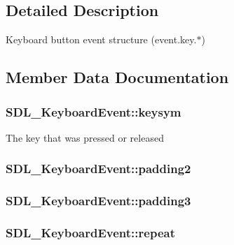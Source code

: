 \subsection{Detailed Description}
Keyboard button event structure (event.\-key.$\ast$) 

\subsection{Member Data Documentation}
\hypertarget{struct_s_d_l___keyboard_event_a2a57ba820a298f2c02ad5d41fd2b1aa8}{
\subsubsection[{keysym}]{ S\-D\-L\-\_\-\-Keyboard\-Event\-::keysym}}\label{struct_s_d_l___keyboard_event_a2a57ba820a298f2c02ad5d41fd2b1aa8}
The key that was pressed or released \hypertarget{struct_s_d_l___keyboard_event_ae270122f757f76171318294afd2c95e6}{
\subsubsection[{padding2}]{ S\-D\-L\-\_\-\-Keyboard\-Event\-::padding2}}\label{struct_s_d_l___keyboard_event_ae270122f757f76171318294afd2c95e6}
\hypertarget{struct_s_d_l___keyboard_event_ae1831035ef556a7b09efcd2469f26f7a}{
\subsubsection[{padding3}]{ S\-D\-L\-\_\-\-Keyboard\-Event\-::padding3}}\label{struct_s_d_l___keyboard_event_ae1831035ef556a7b09efcd2469f26f7a}
\hypertarget{struct_s_d_l___keyboard_event_a3edac3b36304812d533795c9df4ed4c1}{
\subsubsection[{repeat}]{ S\-D\-L\-\_\-\-Keyboard\-Event\-::repeat}}\label{struct_s_d_l___keyboard_event_a3edac3b36304812d533795c9df4ed4c1}
